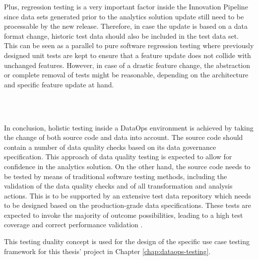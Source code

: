 Plus, regression testing is a very important factor inside the Innovation Pipeline \cite{Shen2019} since data sets generated prior to the analytics solution update still need to be processable by the new release. Therefore, in case the update is based on a data format change, historic test data should also be included in the test data set. This can be seen as a parallel to pure software regression testing where previously designed unit tests are kept to ensure that a feature update does not collide with unchanged features. However, in case of a drastic feature change, the abstraction or complete removal of tests might be reasonable, depending on the architecture and specific feature update at hand.

\\\

In conclusion, holistic testing inside a DataOps environment is achieved by taking the change of both source code and data into account. The source code should contain a number of data quality checks based on its data governance specification. This approach of data quality testing is expected to allow for confidence in the analytics solution. On the other hand, the source code needs to be tested by means of traditional software testing methods, including the validation of the data quality checks and of all transformation and analysis actions. This is to be supported by an extensive test data repository which needs to be designed based on the production-grade data specifications. These tests are expected to invoke the majority of outcome possibilities, leading to a high test coverage and correct performance validation \cite{DataKitchen2020a}.

This testing duality concept is used for the design of the specific use case testing framework for this thesis' project in Chapter \ref{chap:dataops-testing}.

